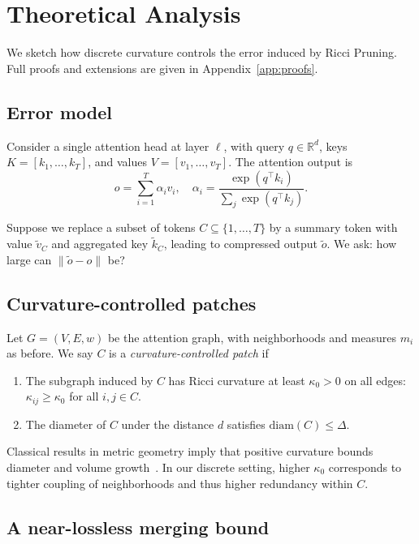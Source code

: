 \documentclass{article}
\theoremstyle{plain}
\theoremstyle{definition}
\theoremstyle{remark}
\newcommand{\RR}{\mathbb{R}}
\begin{document}
\section{Theoretical Analysis}
\label{sec:theory}

We sketch how discrete curvature controls the error induced by Ricci Pruning. Full proofs and extensions are given in Appendix~\ref{app:proofs}.

\subsection{Error model}

Consider a single attention head at layer $\ell$, with query $q \in \RR^d$, keys $K = [k_1,\dots,k_T]$, and values $V = [v_1,\dots,v_T]$. The attention output is
\begin{equation}
  o = \sum_{i=1}^T \alpha_i v_i, \quad
  \alpha_i = \frac{\exp(q^\top k_i)}{\sum_j \exp(q^\top k_j)}.
\end{equation}

Suppose we replace a subset of tokens $C \subseteq \{1,\dots,T\}$ by a summary token with value $\tilde{v}_C$ and aggregated key $\tilde{k}_C$, leading to compressed output $\tilde{o}$. We ask: how large can $\|\tilde{o}-o\|$ be?

\subsection{Curvature-controlled patches}

Let $G=(V,E,w)$ be the attention graph, with neighborhoods and measures $m_i$ as before. We say $C$ is a \emph{curvature-controlled patch} if
\begin{enumerate}
  \item The subgraph induced by $C$ has Ricci curvature at least $\kappa_0>0$ on all edges: $\kappa_{ij}\ge\kappa_0$ for all $i,j\in C$.
  \item The diameter of $C$ under the distance $d$ satisfies $\mathrm{diam}(C) \le \Delta$.
\end{enumerate}

Classical results in metric geometry imply that positive curvature bounds diameter and volume growth~\citep{ollivier2009ricci,villani2009optimal}. In our discrete setting, higher $\kappa_0$ corresponds to tighter coupling of neighborhoods and thus higher redundancy within $C$.

\subsection{A near-lossless merging bound}
\end{document}
